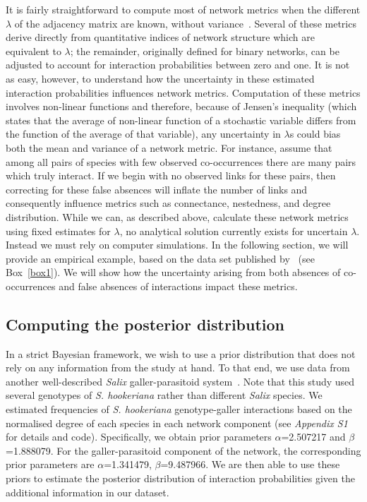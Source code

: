 \documentclass[12pt]{article}
\begin{document}
    It is fairly straightforward to compute most of network metrics when the different $\lambda$ of the adjacency matrix are known, without variance~\citep{Poisot2016}. Several of these metrics derive directly from quantitative indices of network structure which are equivalent to $\lambda$; the remainder, originally defined for binary networks, can be adjusted to account for interaction probabilities between zero and one. It is not as easy, however, to understand how the uncertainty in these estimated interaction probabilities influences network metrics. Computation of these metrics involves non-linear functions and therefore, because of Jensen's inequality (which states that the average of non-linear function of a stochastic variable differs from the function of the average of that variable), any uncertainty in $\lambda$s could bias both the mean and variance of a network metric. For instance, assume that among all pairs of species with few observed co-occurrences there are many pairs which truly interact. If we begin with no observed links for these pairs, then correcting for these false absences will inflate the number of links and consequently influence metrics such as connectance, nestedness, and degree distribution. While we can, as described above, calculate these network metrics using fixed estimates for $\lambda$, no analytical solution currently exists for uncertain $\lambda$. Instead we must rely on computer simulations. In the following section, we will provide an empirical example, based on the data set published by~\citet{Kopelke2017} (see Box~\ref{box1}). We will show how the uncertainty arising from both absences of co-occurrences and false absences of interactions impact these metrics. %



  \subsection*{Computing the posterior distribution}

      In a strict Bayesian framework, we wish to use a prior distribution that does not rely on any information from the study at hand. To that end, we use data from another well-described \emph{Salix} galler-parasitoid system~\citep{Barbour2016,Barbour2016Dryad}. Note that this study used several genotypes of \emph{S. hookeriana} rather than different \emph{Salix} species. We estimated frequencies of  \emph{S. hookeriana} genotype-galler interactions based on the normalised degree of each species in each network component (see \emph{Appendix S1} for details and code). Specifically, we obtain prior parameters $\alpha$=2.507217 and $\beta$=1.888079. For the galler-parasitoid component of the network, the corresponding prior parameters are $\alpha$=1.341479, $\beta$=9.487966. We are then able to use these priors to estimate the posterior distribution of interaction probabilities given the additional information in our dataset.
  
\end{document}

